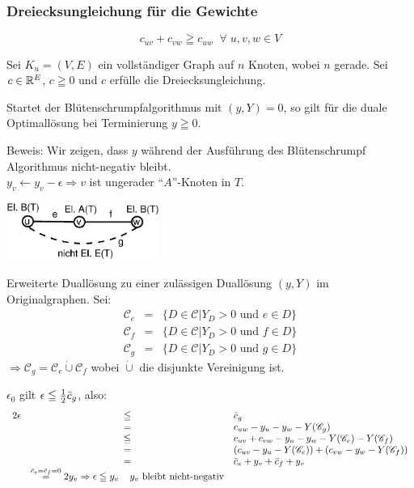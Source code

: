 \subsubsection{Dreiecksungleichung für die Gewichte}

\[c_{u v} + c_{v w} \geqq c_{u w} \; \; \forall \; u,v,w \in V\]

\begin{satz}
Sei $K_u = (V,E)$ ein vollständiger Graph auf $n$ Knoten, wobei $n$ gerade.
Sei $c \in \mathbb{R}^E$, $c\geqq 0$ und $c$ erfülle die Dreiecksungleichung.

Startet der Blütenschrumpfalgorithmus mit $(y,Y)=0$, so gilt für die duale
Optimallösung bei Terminierung $y \geqq 0$.
\end{satz}
Beweis: Wir zeigen, dass $y$ während der Ausführung des Blütenschrumpf
Algorithmus nicht-negativ bleibt.\\
$y_v \leftarrow y_v - \epsilon \Rightarrow v$ ist ungerader "`$A$"'-Knoten
in $T$.

\includegraphics[width=5cm]{bilder/5-3VUngerKn}

Erweiterte Duallösung zu einer zulässigen Duallösung $(y,Y)$ im
Originalgraphen. Sei:
\[\begin{array}{rcl}
\mathscr{C}_e &=& \{D \in \mathscr{C} | Y_D > 0 \mbox{ und } e \in D\}\\
\mathscr{C}_f &=& \{D \in \mathscr{C} | Y_D > 0 \mbox{ und } f \in D\}\\
\mathscr{C}_g &=& \{D \in \mathscr{C} | Y_D > 0 \mbox{ und } g \in D\}
\end{array}\]
$\Rightarrow \mathscr{C}_g = \mathscr{C}_e \dot{\cup} \mathscr{C}_f$ wobei
$\dot{\cup}$ die disjunkte Vereinigung ist.

$\epsilon_0$ gilt $\epsilon \leqq \frac{1}{2} \bar{c}_g$, also:
\[\begin{array}{rcl}
2 \epsilon &\leqq & \bar{c}_g\\
&=& c_{u w} - y_u - y_w - Y(\mathscr{C}_g)\\
&\leqq& c_{u v} + c_{v w} - y_u - y_w - Y(\mathscr{C}_e) -
Y(\mathscr{C}_f)\\
&=& ( c_{u v} - y_u -Y(\mathscr{C}_e)) + (c_{v w} - y_w -
Y(\mathscr{C}_f))\\
&=& \bar{c}_e + y_v + \bar{c}_f + y_v\\
&\stackrel{\bar{c}_e=\bar{c}_f=0}{=} 2 y_v \Rightarrow \epsilon \leqq y_v
\hspace{4mm} y_v\mbox{ bleibt nicht-negativ}
\end{array}\]

